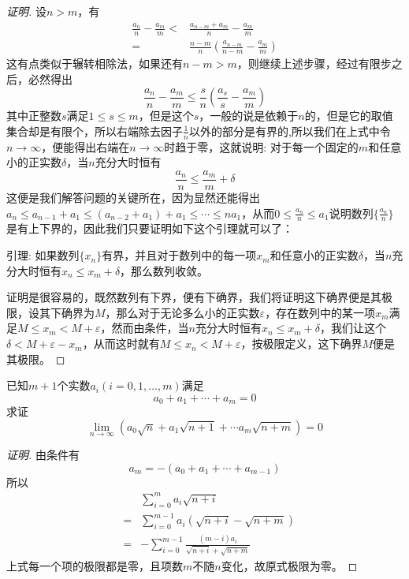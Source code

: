 \begin{proof}[证明]
设$n>m$，有
\begin{align*}
\frac{a_n}{n} - \frac{a_m}{m} < & \frac{a_{n-m}+a_m}{n} - \frac{a_m}{m} \\
 = & \frac{n-m}{n} \left( \frac{a_{n-m}}{n-m} - \frac{a_m}{m} \right)
\end{align*}
这有点类似于辗转相除法，如果还有$n-m>m$，则继续上述步骤，经过有限步之后，必然得出
\[ \frac{a_n}{n} - \frac{a_m}{m} \leqslant \frac{s}{n} \left( \frac{a_s}{s} - \frac{a_m}{m} \right) \]
其中正整数$s$满足$1 \leqslant s \leqslant m$，但是这个$s$，一般的说是依赖于$n$的，但是它的取值集合却是有限个，所以右端除去因子$\frac{1}{n}$以外的部分是有界的,所以我们在上式中令$n \to \infty$，便能得出右端在$n \to \infty$时趋于零，这就说明: 对于每一个固定的$m$和任意小的正实数$\delta$，当$n$充分大时恒有
\[ \frac{a_n}{n} \leqslant \frac{a_m}{m} + \delta \]
这便是我们解答问题的关键所在，因为显然还能得出$a_n \leqslant a_{n-1}+a_1 \leqslant (a_{n-2}+a_1)+a_1 \leqslant \cdots \leqslant na_1$，从而$0 \leqslant \frac{a_n}{n} \leqslant a_1$说明数列$\{\frac{a_n}{n}\}$是有上下界的，因此我们只要证明如下这个引理就可以了：

引理: 如果数列$\{ x_n \}$有界，并且对于数列中的每一项$x_m$和任意小的正实数$\delta$，当$n$充分大时恒有$x_n \leqslant x_m+\delta$，那么数列收敛。

证明是很容易的，既然数列有下界，便有下确界，我们将证明这下确界便是其极限，设其下确界为$M$，那么对于无论多么小的正实数$\varepsilon$，存在数列中的某一项$x_m$满足$M \leqslant x_m  < M+\varepsilon$，然而由条件，当$n$充分大时恒有$x_n \leqslant x_m+\delta$，我们让这个$\delta<M+\varepsilon-x_m$，从而这时就有$M \leqslant x_n  < M+\varepsilon$，按极限定义，这下确界$M$便是其极限。
\end{proof}

\begin{exercise}
  已知$m+1$个实数$a_i(i=0,1,\ldots,m)$满足
  \[ a_0+a_1+\cdots+a_m=0 \]
  求证
  \[ \lim_{n \to \infty} (a_0 \sqrt{n}+a_1 \sqrt{n+1}+\cdots a_m \sqrt{n+m}) = 0 \]
\end{exercise}

\begin{proof}[证明]
  由条件有
  \[ a_m = -(a_0+a_1+\cdots+a_{m-1}) \]
  所以
  \begin{eqnarray*}
    && \sum_{i=0}^m a_i \sqrt{n+i}  \\
    & = & \sum_{i=0}^{m-1} a_i (\sqrt{n+i}-\sqrt{n+m}) \\
    & = & - \sum_{i=0}^{m-1} \frac{(m-i)a_i}{\sqrt{n+i}+\sqrt{n+m}}
  \end{eqnarray*}
  上式每一个项的极限都是零，且项数$m$不随$n$变化，故原式极限为零。
\end{proof}


